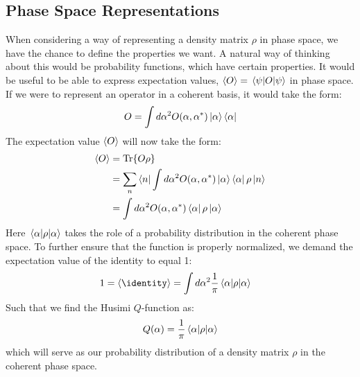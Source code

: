 \subsection{Phase Space Representations}
 \noindent
When considering a way of representing a density matrix $\rho$ in phase space, we have the chance to define the properties we want. A natural way of thinking about this would be probability functions, which have certain properties. It would be useful to be able to express expectation values, $\expval{O} = \mel{\psi}{O}{\psi}$ in phase space. If we were to represent an operator in a coherent basis, it would take the form:
\begin{equation}
    O = \int d\alpha^2 O(\alpha, \alpha^*)\ket{\alpha}\bra{\alpha} 
\end{equation}
The expectation value $\expval{O}$ will now take the form: 
\begin{align*}
    \expval{O} &= \Tr{O \rho} \\
               &= \sum_n \bra{n} \int d\alpha^2 O(\alpha, \alpha^*)\ket{\alpha}\bra{\alpha} \rho \ket{n} \\
               &= \int d\alpha^2 O(\alpha, \alpha^*)\bra{\alpha} \rho \ket{\alpha}
\end{align*}
Here $\mel{\alpha}{\rho}{\alpha}$ takes the role of a probability distribution in the coherent phase space. To further ensure that the function is properly normalized, we demand the expectation value of the identity to equal 1:
\begin{align*}
    1 = \expval{\identity} &= \int d\alpha^2 \frac{1}{\pi} \mel{\alpha}{\rho}{\alpha}
\end{align*}
Such that we find the Husimi $Q$-function as:
\begin{equation}
    Q(\alpha) =  \frac{1}{\pi} \mel{\alpha}{\rho}{\alpha}
\end{equation}
which will serve as our probability distribution of a density matrix $\rho$ in the coherent phase space.

